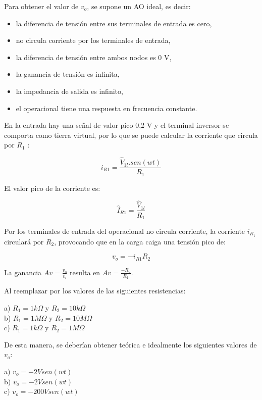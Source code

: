 Para obtener el valor de $v_{o}$, se supone un AO ideal, es decir:
\begin{itemize}
\item la diferencia de tensión entre sus terminales de entrada es cero,
\item no circula corriente por los terminales de entrada,
\item la diferencia de tensión entre ambos nodos es 0 V,
\item la ganancia de tensión es infinita,
\item la impedancia de salida es infinito,
\item el operacional tiene una respuesta en frecuencia constante.
\end{itemize}
En la entrada hay una señal de valor pico 0,2 V y el terminal inversor se comporta como tierra virtual, por lo que se puede calcular la corriente que circula por $R_{1}$ :

$$i_{R1} = \frac{\hat{V}_{1l}.sen(wt)}{R_{1}}$$

El valor pico de la corriente es:

$$\hat{I}_{R1} = \frac{\hat{V}_{1l}}{R_{1}}$$

Por los terminales de entrada del operacional no circula corriente, la corriente $i_{R_{1}}$ circulará por $R_{2}$, provocando que en la carga caiga una tensión pico de:

$$ v_{o}=-i_{R1}R_{2}$$

La ganancia $Av = \frac{v_{o}}{v_{i}}$ resulta en $Av = \frac{-R_{2}}{R_{1}}$.

Al reemplazar por los valores de las siguientes resistencias:\\

\begin{center}
a) $R_{1}= 1k\Omega$ y $R_{2}=10 k\Omega$\\
b) $R_{1}= 1M\Omega$ y $R_{2}=10 M\Omega$\\
c) $R_{1}= 1k\Omega$ y $R_{2}=1 M\Omega$\\
\end{center}

De esta manera, se deberían obtener teórica e idealmente los siguientes valores de $v_{o}$:
\begin{center}
a) $v_{o} = -2Vsen(wt)$\\
b) $v_{o} = -2Vsen(wt)$\\
c) $v_{o} = -200Vsen(wt)$\\
\end{center}


